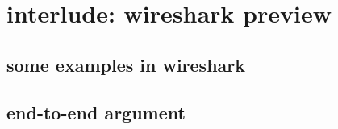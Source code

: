 

\section{interlude: wireshark preview}



\subsection{some examples in wireshark}


\subsection{end-to-end argument}



